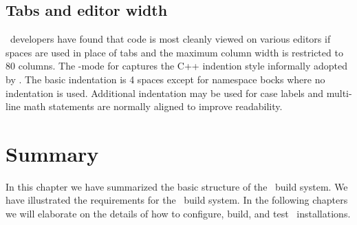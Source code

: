 \subsection{Tabs and editor width}
\label{sec:cc-tabs}

\draco\ developers have found that code is most cleanly viewed on various editors if spaces are used in place of tabs and the maximum column width is restricted to 80 columns.  The \draco-mode for  captures the C++ indention style informally adopted by \draco.  The basic indentation is 4 spaces except for namespace bocks where no indentation is used.  Additional indentation may be used for case labels and multi-line math statements are normally aligned to improve readability.


\section{Summary}

In this chapter we have summarized the basic structure of the \draco\ 
build system.  We have illustrated the requirements for the \draco\ 
build system.  In the following chapters we will elaborate on the
details of how to configure, build, and test \draco\ installations.

